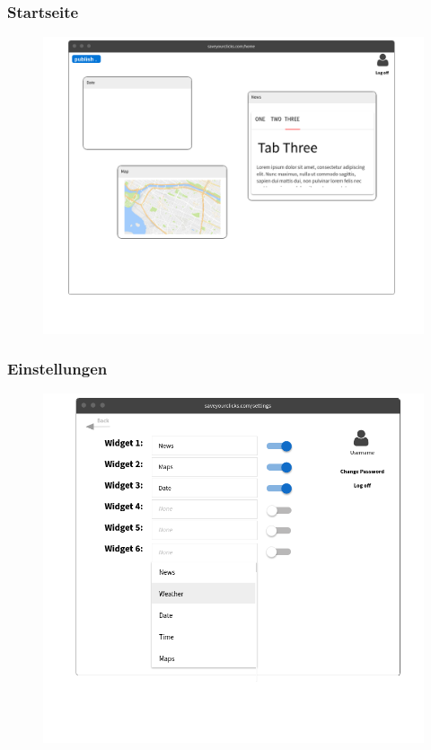 		\subsubsection{Startseite}
			\begin{figure}[H]
				\includegraphics[scale=0.4]{images/p2}
			\end{figure}
		
		\subsubsection{Einstellungen}
			\begin{figure}[H]
				\includegraphics[scale=0.5]{images/p3}
			\end{figure}
		
